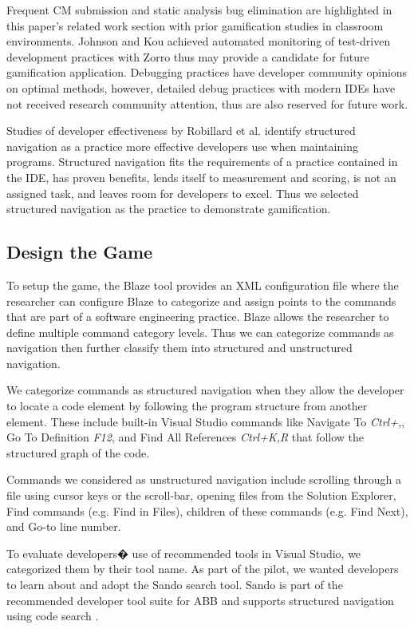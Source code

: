 \documentclass{sig-alternate}
\begin{document}
Frequent CM submission and static analysis bug elimination are highlighted in this paper's related work section with prior gamification studies in classroom environments.  Johnson and Kou achieved automated monitoring of test-driven development practices with Zorro \cite{V:Johnson2007Automated} thus may provide a candidate for future gamification application.   
Debugging practices have developer community opinions on optimal methods, however, detailed debug practices with modern IDEs have not received research community attention, thus are also reserved for future work.  

Studies of developer effectiveness by Robillard et al.\cite{wbsnipes:Robillard2004How} identify structured navigation as a practice more effective developers use when maintaining programs.   Structured navigation fits the requirements of a practice contained in the IDE, has proven benefits, lends itself to measurement and scoring, is not an assigned task, and leaves room for developers to excel.  Thus we selected structured navigation as the practice to demonstrate gamification.

\subsection{Design the Game}

To setup the game, the Blaze tool provides an XML configuration file where the researcher can configure Blaze to categorize and assign points to the commands that are part of a software engineering practice.  Blaze allows the researcher to define multiple command category levels.  Thus we can categorize commands as navigation then further classify them into structured and unstructured navigation.  

We categorize commands as structured navigation when they allow the developer to locate a code element by following the program structure from another element.  These include  built-in Visual Studio commands like Navigate To \textit{Ctrl+,}, Go To Definition \textit{F12}, and Find All References \textit{Ctrl+K,R}  that follow the structured graph of the code.

Commands we considered as unstructured navigation include scrolling through a file using cursor keys or the scroll-bar, opening files from the Solution Explorer, Find commands (e.g. Find in Files), children of these commands (e.g. Find Next), and Go-to line number.

To evaluate developers� use of recommended tools in Visual Studio, we categorized them by their tool name.  As part of the pilot, we wanted developers to learn about and adopt the Sando search tool.  Sando is part of the recommended developer tool suite for ABB and supports structured navigation using code search \cite{Shepherd2012Sando}.
\end{document}
